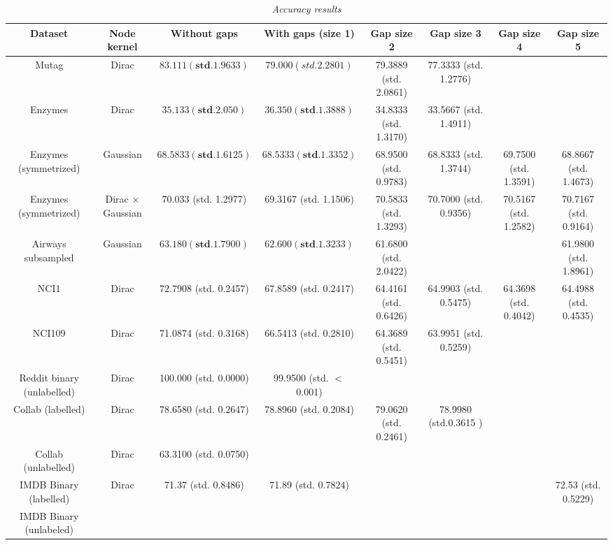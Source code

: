 \documentclass{article}
\begin{document}
\iffalse
\begin{table}[H]
	\centering
	\hspace*{-0.7in}
	\scalebox{0.6} {
		\begin{tabular}{c|c|c|c|c|c|c|c}
		Dataset & Node kernel & Without gaps & With gaps (size 1) & Gap size 2 & Gap size 3 & Gap size 4 & Gap size 5\\
		\hline
		Mutag & Dirac & $\mathbf{83.111 (std. 1.9633)}$ & $79.000 (std. 2.2801)$ & 79.3889 (std. 2.0861) & 77.3333 (std. 1.2776) & & \\
		Enzymes & Dirac & $\mathbf{35.133 (std. 2.050)}$ & $\mathbf{36.350 (std. 1.3888)}$ & 34.8333 (std. 1.3170) & 33.5667 (std. 1.4911) & & \\
		Enzymes (symmetrized) & Gaussian & $\mathbf{68.5833 (std. 1.6125)}$ & $\mathbf{68.5333 (std. 1.3352)}$ & 68.9500 (std. 0.9783) & 68.8333 (std. 1.3744) & 69.7500 (std. 1.3591) & 68.8667 (std. 1.4673) \\
		Enzymes (symmetrized) & Dirac $\times$ Gaussian & 70.033 (std. 1.2977) & 69.3167 (std. 1.1506) & 70.5833 (std. 1.3293) & 70.7000 (std. 0.9356) & 70.5167 (std. 1.2582) & 70.7167 (std. 0.9164)\\
		Airways subsampled & Gaussian & $\mathbf{63.180 (std. 1.7900)}$ & $\mathbf{62.600 (std. 1.3233)}$ & 61.6800 (std. 2.0422) & & & 61.9800 (std. 1.8961) \\
		NCI1 & Dirac & 72.7908 (std. 0.2457) & 67.8589 (std. 0.2417) & 64.4161 (std. 0.6426) & 64.9903 (std. 0.5475) & 64.3698 (std. 0.4042) & 64.4988 (std. 0.4535) \\
		NCI109 & Dirac & 71.0874 (std. 0.3168) & 66.5413 (std. 0.2810) & 64.3689 (std. 0.5451) & 63.9951 (std. 0.5259) & & \\
		Reddit binary (unlabelled) & Dirac & 100.000 (std. 0.0000) & 99.9500 (std. $<$ 0.001) & & & &  \\
	
		Collab (labelled) & Dirac & 78.6580 (std. 0.2647) & 78.8960 (std. 0.2084) & 79.0620 (std. 0.2461) & 78.9980 (std.0.3615 ) & \\
		Collab (unlabelled) & Dirac & 63.3100 (std. 0.0750) & & & & & \\
		IMDB Binary (labelled) & Dirac & 71.37 (std. 0.8486) & 71.89 (std. 0.7824) & & & & 72.53 (std. 0.5229) \\
		IMDB Binary (unlabeled) & 
		


		\end{tabular}
	}
	\caption{\textit{Accuracy results}}
	\label{table:raccuracy_results}
\end{table}
\end{document}
